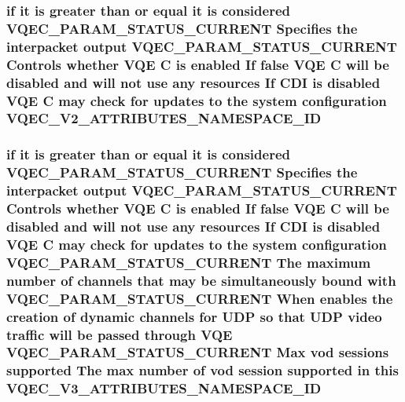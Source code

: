 \subsubsection{\setlength{\rightskip}{0pt plus 5cm}if it is greater than or equal it is considered VQEC\_\-PARAM\_\-STATUS\_\-CURRENT Specifies the interpacket output VQEC\_\-PARAM\_\-STATUS\_\-CURRENT Controls whether VQE \bf{C} is enabled If false VQE \bf{C} will be disabled and will not use any resources If CDI is disabled VQE \bf{C} may check for updates \bf{to} the system configuration \bf{VQEC\_\-V2\_\-ATTRIBUTES\_\-NAMESPACE\_\-ID}}\label{vqec__cfg__settings_8h_5664bbcbd954432adf081e8f0a1af327}


\subsubsection{\setlength{\rightskip}{0pt plus 5cm}if it is greater than or equal it is considered VQEC\_\-PARAM\_\-STATUS\_\-CURRENT Specifies the interpacket output VQEC\_\-PARAM\_\-STATUS\_\-CURRENT Controls whether VQE \bf{C} is enabled If false VQE \bf{C} will be disabled and will not use any resources If CDI is disabled VQE \bf{C} may check for updates \bf{to} the system configuration VQEC\_\-PARAM\_\-STATUS\_\-CURRENT The maximum number of \bf{channels} that may be simultaneously bound with VQEC\_\-PARAM\_\-STATUS\_\-CURRENT When enables the creation of dynamic \bf{channels} for UDP so that UDP video traffic will be passed through VQE VQEC\_\-PARAM\_\-STATUS\_\-CURRENT Max vod sessions supported The max number of vod session supported in \bf{this} \bf{VQEC\_\-V3\_\-ATTRIBUTES\_\-NAMESPACE\_\-ID}}\label{vqec__cfg__settings_8h_b2f1ba44c7f4b7f3dbe743d9ebd73031}


